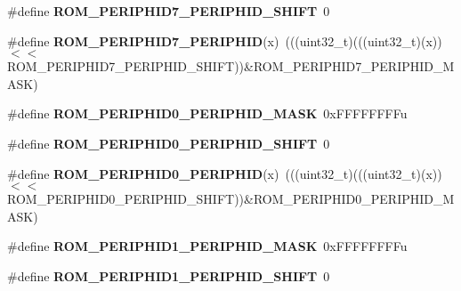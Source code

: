 \begin{DoxyCompactItemize}
\#define {\bfseries R\+O\+M\+\_\+\+P\+E\+R\+I\+P\+H\+I\+D7\+\_\+\+P\+E\+R\+I\+P\+H\+I\+D\+\_\+\+S\+H\+I\+FT}~0
\item 
\mbox{\label{group___r_o_m___register___masks_ga954df1566228d34b0f016073d865e878}} 
\#define {\bfseries R\+O\+M\+\_\+\+P\+E\+R\+I\+P\+H\+I\+D7\+\_\+\+P\+E\+R\+I\+P\+H\+ID}(x)~(((uint32\+\_\+t)(((uint32\+\_\+t)(x))$<$$<$R\+O\+M\+\_\+\+P\+E\+R\+I\+P\+H\+I\+D7\+\_\+\+P\+E\+R\+I\+P\+H\+I\+D\+\_\+\+S\+H\+I\+FT))\&R\+O\+M\+\_\+\+P\+E\+R\+I\+P\+H\+I\+D7\+\_\+\+P\+E\+R\+I\+P\+H\+I\+D\+\_\+\+M\+A\+SK)
\item 
\mbox{\label{group___r_o_m___register___masks_ga2dfed5a6af54f8d29e984653d14a2d1a}} 
\#define {\bfseries R\+O\+M\+\_\+\+P\+E\+R\+I\+P\+H\+I\+D0\+\_\+\+P\+E\+R\+I\+P\+H\+I\+D\+\_\+\+M\+A\+SK}~0x\+F\+F\+F\+F\+F\+F\+F\+Fu
\item 
\mbox{\label{group___r_o_m___register___masks_gaacd7e0172c630fb56d8d465c16111feb}} 
\#define {\bfseries R\+O\+M\+\_\+\+P\+E\+R\+I\+P\+H\+I\+D0\+\_\+\+P\+E\+R\+I\+P\+H\+I\+D\+\_\+\+S\+H\+I\+FT}~0
\item 
\mbox{\label{group___r_o_m___register___masks_ga4e81784ff5ff7bb04e70159467a44e6f}} 
\#define {\bfseries R\+O\+M\+\_\+\+P\+E\+R\+I\+P\+H\+I\+D0\+\_\+\+P\+E\+R\+I\+P\+H\+ID}(x)~(((uint32\+\_\+t)(((uint32\+\_\+t)(x))$<$$<$R\+O\+M\+\_\+\+P\+E\+R\+I\+P\+H\+I\+D0\+\_\+\+P\+E\+R\+I\+P\+H\+I\+D\+\_\+\+S\+H\+I\+FT))\&R\+O\+M\+\_\+\+P\+E\+R\+I\+P\+H\+I\+D0\+\_\+\+P\+E\+R\+I\+P\+H\+I\+D\+\_\+\+M\+A\+SK)
\item 
\mbox{\label{group___r_o_m___register___masks_ga89bae76549b2b639d154bbab60fa87a6}} 
\#define {\bfseries R\+O\+M\+\_\+\+P\+E\+R\+I\+P\+H\+I\+D1\+\_\+\+P\+E\+R\+I\+P\+H\+I\+D\+\_\+\+M\+A\+SK}~0x\+F\+F\+F\+F\+F\+F\+F\+Fu
\item 
\mbox{\label{group___r_o_m___register___masks_ga9370b3491eef6cf277f1b64339d4cacf}} 
\#define {\bfseries R\+O\+M\+\_\+\+P\+E\+R\+I\+P\+H\+I\+D1\+\_\+\+P\+E\+R\+I\+P\+H\+I\+D\+\_\+\+S\+H\+I\+FT}~0
\item 
\mbox{\label{group___r_o_m___register___masks_ga67e3b02a049c4ac0c8f3d065175e655e}} 

\end{DoxyCompactItemize}
